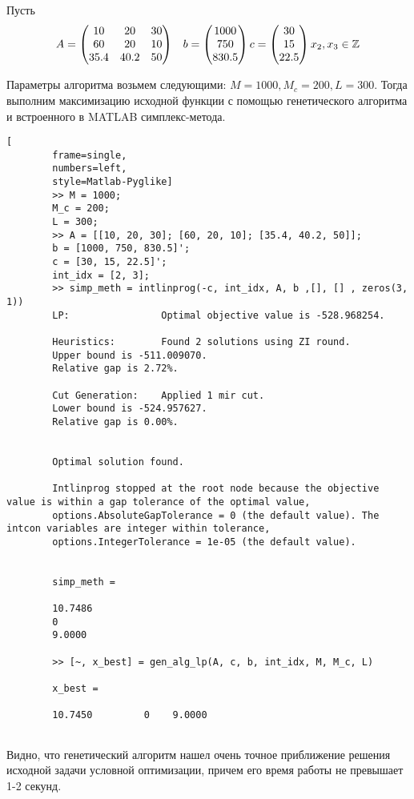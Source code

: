 \documentclass[../main.tex]{subfiles}
\begin{document}
	Пусть 
	\[\begin{aligned}
		A &= \begin{pmatrix}
			10 & 20& 30 \\ 
			60 & 20& 10 \\ 
			35.4 & 40.2& 50 \\ 
		\end{pmatrix}
	\end{aligned} \\ 
		b = \begin{pmatrix}
		1000 \\
		750 \\
		830.5
	\end{pmatrix} \\
		c = \begin{pmatrix}
		30 \\
		15 \\ 
		22.5 \\
	\end{pmatrix} \\
	x_2, x_3 \in \mathbb{Z}\]
	
	Параметры алгоритма возьмем следующими: $M=1000, M_c = 200, L=300$. Тогда выполним максимизацию исходной функции с помощью генетического алгоритма и встроенного в MATLAB симплекс-метода.
	
	\begin{lstlisting}[
		frame=single,
		numbers=left,
		style=Matlab-Pyglike]
		>> M = 1000;
		M_c = 200;
		L = 300;
		>> A = [[10, 20, 30]; [60, 20, 10]; [35.4, 40.2, 50]];
		b = [1000, 750, 830.5]';
		c = [30, 15, 22.5]';
		int_idx = [2, 3];
		>> simp_meth = intlinprog(-c, int_idx, A, b ,[], [] , zeros(3, 1))
		LP:                Optimal objective value is -528.968254.                                          
		
		Heuristics:        Found 2 solutions using ZI round.                                                
		Upper bound is -511.009070.                                                      
		Relative gap is 2.72%.                                                          
		
		Cut Generation:    Applied 1 mir cut.                                                               
		Lower bound is -524.957627.                                                      
		Relative gap is 0.00%.                                                          
		
		
		Optimal solution found.
		
		Intlinprog stopped at the root node because the objective value is within a gap tolerance of the optimal value,
		options.AbsoluteGapTolerance = 0 (the default value). The intcon variables are integer within tolerance,
		options.IntegerTolerance = 1e-05 (the default value).
		
		
		simp_meth =
		
		10.7486
		0
		9.0000
		
		>> [~, x_best] = gen_alg_lp(A, c, b, int_idx, M, M_c, L)
		
		x_best =
		
		10.7450         0    9.0000
		
	\end{lstlisting}

	Видно, что генетический алгоритм нашел очень точное приближение решения исходной задачи условной оптимизации, причем его время работы не превышает 1-2 секунд.
	
	
	
	
\end{document}
